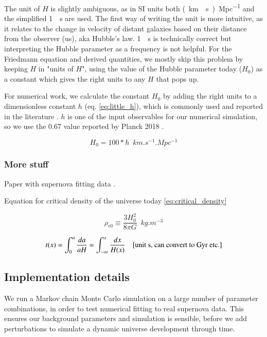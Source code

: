 The unit of $H$ is slightly ambiguous, as in SI units both \unit{(km \per s)\per Mpc} and the simplified \unit{1 \per s} are used. The first way of writing the unit is more intuitive, as it relates to the change in velocity of distant galaxies based on their distance from the observer (us), aka Hubble's law. \unit{1 \per s} is technically correct but interpreting the Hubble parameter as a frequency is not helpful. For the Friedmann equation and derived quantities, we mostly skip this problem by keeping $H$ in "units of $H$", using the value of the Hubble parameter today ($H_0$) as a constant which gives the right units to any $H$ that pops up.

For numerical work, we calculate the constant $H_0$ by adding the right units to a dimensionless constant $h$ (eq. \ref{eq:little_h}), which is commonly used and reported in the literature \citep{crotonDamnYouLittle2013}. $h$ is one of the input observables for our numerical simulation, so we use the $0.67$ value reported by Planck 2018 \citep{collaborationPlanck2018Results2020}.

\begin{equation}\label{eq:little_h}
H_0 = 100 * h \enspace \unit{km.s^{-1}.Mpc^{-1}}
\end{equation}

\subsubsection{More stuff}

Paper with supernova fitting data \citet{betouleImprovedCosmologicalConstraints2014}.

Equation for critical density of the universe today \ref{eq:critical_density}

\begin{equation}\label{eq:critical_density}
\rho_{c0} \equiv \frac{3H_0^2}{8\pi G} \enspace \unit{kg.m^{-3}}
\end{equation}

\begin{equation}\label{eq:t_of_x}
t(x) = \int_0^a \frac{da}{aH} = \int_{-\infty}^x \frac{dx}{H(x)} \quad [\text{unit \unit{s}, can convert to \unit{\giga yr} etc.}]
\end{equation}

\subsection{Implementation details}
We run a Markov chain Monte Carlo simulation on a large number of parameter combinations, in order to test numerical fitting to real supernova data. This ensures our background parameters and simulation is sensible, before we add perturbations to simulate a dynamic universe development through time.

